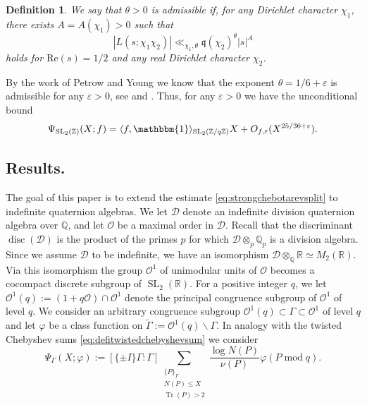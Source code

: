 \documentclass{article}
\newtheorem{defi}[lem]{Definition}
\theoremstyle{named}
\newcommand{\D}{\mathcal{D}}
\newcommand{\Z}{\mathbb{Z}}
\newcommand{\Q}{\mathbb{Q}}
\newcommand{\R}{\mathbb{R}}
\renewcommand{\O}{\mathcal{O}}
\newcommand{\q}{\mathfrak{q}}
\DeclareMathOperator{\SL}{SL}
\DeclareMathOperator{\disc}{disc}
\DeclareMathOperator{\Tr}{Tr}
\DeclareMathOperator{\modulo}{mod}
\begin{document}
\begin{defi}\label{defi:admissibleexponent}
We say that $\theta > 0$ is \emph{admissible} if, for any Dirichlet character $\chi_1$, there exists $A = A(\chi_1) > 0$ such that
\begin{equation*}
    |L(s; \chi_1 \chi_2)| \ll_{\chi_1, \theta} \q(\chi_2)^\theta |s|^A
\end{equation*}
holds for $\text{Re}(s) = 1/2$ and any real Dirichlet character $\chi_2$.
\end{defi}

By the work of Petrow and Young we know that the exponent $\theta = 1/6 + \varepsilon$ is admissible for any $\varepsilon > 0$, see \cite{petrowyoung20} and \cite{petrowyoung}. Thus, for any $\varepsilon > 0$ we have the unconditional bound 
\begin{equation}\label{eq:strongsplitchebotarev}
\Psi_{\SL_2(\Z)}(X; f) = \langle f, \mathbbm{1}\rangle_{\SL_2(\Z/q\Z)} X + O_{f, \varepsilon}(X^{25/36 + \varepsilon}).
\end{equation}

\subsection{Results.}
The goal of this paper is to extend the estimate \eqref{eq:strongchebotarevsplit} to indefinite quaternion algebras. We let $\D$ denote an indefinite division quaternion algebra over $\Q$, and let $\O$ be a maximal order in $\D$. Recall that the discriminant $\disc(\D)$ is the product of the primes $p$ for which $\D\otimes_p \Q_p$ is a division algebra. Since we assume $\D$ to be indefinite, we have an isomorphism $\D \otimes_\Q \R \simeq M_2(\R)$. Via this isomorphism the group $\O^1$ of unimodular units of $\O$ becomes a cocompact discrete subgroup of $\SL_2(\R)$. For a positive integer $q$, we let $\O^1(q):= (1 + q\O) \cap \O^1$ denote the principal congruence subgroup of $\O^1$ of level $q$. We consider an arbitrary congruence subgroup $\O^1(q) \subset \Gamma \subset \O^1$ of level $q$ and let $\varphi$ be a class function on $\widetilde{\Gamma} := \O^1(q)\backslash \Gamma$. In analogy with the twisted Chebyshev sums \eqref{eq:defitwistedchebyshevsum} we consider 
\begin{equation}\label{eq:chebyshevquaternion}
    \Psi_{\Gamma}(X; \varphi) := [\{\pm I\}\Gamma: \Gamma]\sum_{\substack{\{P\}_\Gamma\\
    N(P) \leq X\\
    \Tr(P) > 2}} \frac{\log N(P)}{\nu(P)}\varphi(P \modulo q).
\end{equation}
\end{document}
